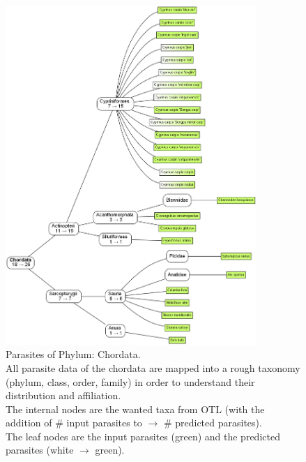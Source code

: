       \begin{figure}
        \centering
        \includegraphics[trim = 0mm 0mm 0mm 0mm, clip, width=0.85\textwidth]{Figures/ChordataParasites.png}
        \caption{Parasites of Phylum: Chordata. \\
          All parasite data of the chordata are mapped into a rough taxonomy (phylum, class, order, 
            family) in order to understand their distribution and affiliation. \\
          The internal nodes are the wanted taxa from OTL (with the addition of \# input parasites to 
            $\rightarrow$ \# predicted parasites). \\
          The leaf nodes are the input parasites (green) and the predicted parasites (white $\rightarrow$ 
            green).}
        \label{fig:ChordataParasites}
      \end{figure}


